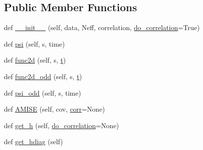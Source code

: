 \subsection*{Public Member Functions}
\begin{DoxyCompactItemize}
\item 
def \mbox{\hyperlink{classgetdist_1_1kde__bandwidth_1_1KernelOptimizer2D_ad9bcba903d202021c28871300de3bede}{\+\_\+\+\_\+init\+\_\+\+\_\+}} (self, data, Neff, correlation, \mbox{\hyperlink{classgetdist_1_1kde__bandwidth_1_1KernelOptimizer2D_aba1b0b161bbb71286e717e801ef2db1f}{do\+\_\+correlation}}=True)
\item 
def \mbox{\hyperlink{classgetdist_1_1kde__bandwidth_1_1KernelOptimizer2D_a7065ba45f5f685a1a6af44d49df74aec}{psi}} (self, s, time)
\item 
def \mbox{\hyperlink{classgetdist_1_1kde__bandwidth_1_1KernelOptimizer2D_a7a5cd818acd3bd52ec4ecbee0ff3366d}{func2d}} (self, s, \mbox{\hyperlink{plotcls_8m_aaccc9105df5383111407fd5b41255e23}{t}})
\item 
def \mbox{\hyperlink{classgetdist_1_1kde__bandwidth_1_1KernelOptimizer2D_ac0096bcca95e418b999498142fe3e411}{func2d\+\_\+odd}} (self, s, \mbox{\hyperlink{plotcls_8m_aaccc9105df5383111407fd5b41255e23}{t}})
\item 
def \mbox{\hyperlink{classgetdist_1_1kde__bandwidth_1_1KernelOptimizer2D_a06b7b35353f0875f56bed480c1f6a2f2}{psi\+\_\+odd}} (self, s, time)
\item 
def \mbox{\hyperlink{classgetdist_1_1kde__bandwidth_1_1KernelOptimizer2D_a63e6a249e37f6783b32d982b8ce5a4f4}{A\+M\+I\+SE}} (self, cov, \mbox{\hyperlink{classgetdist_1_1kde__bandwidth_1_1KernelOptimizer2D_a53a353297fa18dc75ec417dc8d8f433d}{corr}}=None)
\item 
def \mbox{\hyperlink{classgetdist_1_1kde__bandwidth_1_1KernelOptimizer2D_afd388bc2eafda3fe7f8dca0c4dbd2157}{get\+\_\+h}} (self, \mbox{\hyperlink{classgetdist_1_1kde__bandwidth_1_1KernelOptimizer2D_aba1b0b161bbb71286e717e801ef2db1f}{do\+\_\+correlation}}=None)
\item 
def \mbox{\hyperlink{classgetdist_1_1kde__bandwidth_1_1KernelOptimizer2D_ad35e13b353a66f02b5c980e5b69b25ad}{get\+\_\+hdiag}} (self)
\end{DoxyCompactItemize}
